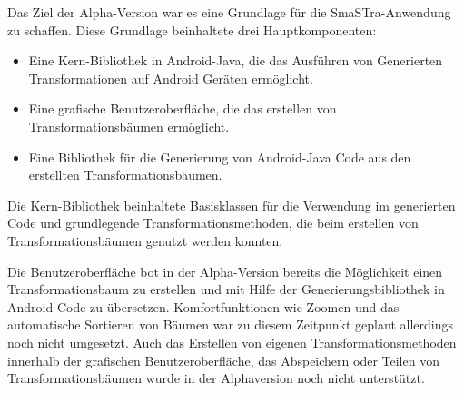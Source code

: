Das Ziel der Alpha-Version war es eine Grundlage für die SmaSTra-Anwendung zu schaffen. Diese Grundlage beinhaltete drei Hauptkomponenten:

\begin{itemize}
\item Eine Kern-Bibliothek in Android-Java, die das Ausführen von Generierten Transformationen auf Android Geräten ermöglicht.
\item Eine grafische Benutzeroberfläche, die das erstellen von Transformationsbäumen ermöglicht.
\item Eine Bibliothek für die Generierung von Android-Java Code aus den erstellten Transformationsbäumen.
\end{itemize}

Die Kern-Bibliothek beinhaltete Basisklassen für die Verwendung im generierten Code und grundlegende Transformationsmethoden, die beim erstellen von Transformationsbäumen genutzt werden konnten.

Die Benutzeroberfläche bot in der Alpha-Version bereits die Möglichkeit einen Transformationsbaum zu erstellen und mit Hilfe der Generierungsbibliothek in Android Code zu übersetzen. Komfortfunktionen wie Zoomen und das automatische Sortieren von Bäumen war zu diesem Zeitpunkt geplant allerdings noch nicht umgesetzt. Auch das Erstellen von eigenen Transformationsmethoden innerhalb der grafischen Benutzeroberfläche, das Abspeichern oder Teilen von Transformationsbäumen wurde in der Alphaversion noch nicht unterstützt.